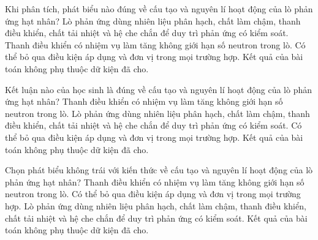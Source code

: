\begin{ex}
Khi phân tích, phát biểu nào đúng về cấu tạo và nguyên lí hoạt động của lò phản ứng hạt nhân?
\choice
{\True Lò phản ứng dùng nhiên liệu phân hạch, chất làm chậm, thanh điều khiển, chất tải nhiệt và hệ che chắn để duy trì phản ứng có kiểm soát.}
{Thanh điều khiển có nhiệm vụ làm tăng không giới hạn số neutron trong lò.}
{Có thể bỏ qua điều kiện áp dụng và đơn vị trong mọi trường hợp.}
{Kết quả của bài toán không phụ thuộc dữ kiện đã cho.}
\end{ex}

\begin{ex}
Kết luận nào của học sinh là đúng về cấu tạo và nguyên lí hoạt động của lò phản ứng hạt nhân?
\choice
{Thanh điều khiển có nhiệm vụ làm tăng không giới hạn số neutron trong lò.}
{\True Lò phản ứng dùng nhiên liệu phân hạch, chất làm chậm, thanh điều khiển, chất tải nhiệt và hệ che chắn để duy trì phản ứng có kiểm soát.}
{Có thể bỏ qua điều kiện áp dụng và đơn vị trong mọi trường hợp.}
{Kết quả của bài toán không phụ thuộc dữ kiện đã cho.}
\end{ex}

\begin{ex}
Chọn phát biểu không trái với kiến thức về cấu tạo và nguyên lí hoạt động của lò phản ứng hạt nhân?
\choice
{Thanh điều khiển có nhiệm vụ làm tăng không giới hạn số neutron trong lò.}
{Có thể bỏ qua điều kiện áp dụng và đơn vị trong mọi trường hợp.}
{\True Lò phản ứng dùng nhiên liệu phân hạch, chất làm chậm, thanh điều khiển, chất tải nhiệt và hệ che chắn để duy trì phản ứng có kiểm soát.}
{Kết quả của bài toán không phụ thuộc dữ kiện đã cho.}
\end{ex}

